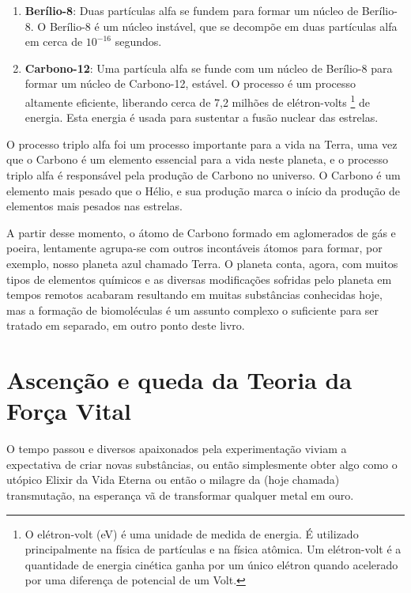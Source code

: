 \documentclass[a4paper,12pt,]{book}
\begin{document}
\begin{enumerate}
	\item \textbf{Berílio-8}: Duas partículas alfa se fundem para formar um núcleo de Berílio-8. O Berílio-8 é um núcleo instável, que se decompõe em duas partículas alfa em cerca de $10^{-16}$ segundos.
	\item \textbf{Carbono-12}: Uma partícula alfa se funde com um núcleo de Berílio-8 para formar um núcleo de Carbono-12, estável. O processo é um processo altamente eficiente, liberando cerca de 7,2 milhões de elétron-volts \footnote{O elétron-volt (eV) é uma unidade de medida de energia. É utilizado principalmente na física de partículas e na física atômica. Um elétron-volt é a quantidade de energia cinética ganha por um único elétron quando acelerado por uma diferença de potencial de um Volt.} de energia. Esta energia é usada para sustentar a fusão nuclear das estrelas.
\end{enumerate}

O processo triplo alfa foi um processo importante para a vida na Terra, uma vez que o Carbono é um elemento essencial para a vida neste planeta, e o processo triplo alfa é responsável pela produção de Carbono no universo. O Carbono é um elemento mais pesado que o Hélio, e sua produção marca o início da produção de elementos mais pesados nas estrelas.

A partir desse momento, o átomo de Carbono formado em aglomerados de gás e poeira, lentamente agrupa-se com outros incontáveis átomos para formar, por exemplo, nosso planeta azul chamado Terra. O planeta conta, agora, com muitos tipos de elementos químicos e as diversas modificações sofridas pelo planeta em tempos remotos acabaram resultando em muitas substâncias conhecidas hoje, mas a formação de biomoléculas é um assunto complexo o suficiente para ser tratado em separado, em outro ponto deste livro.
	
\chapter{Ascenção e queda da Teoria da Força Vital}
\begin{mdframed}[backgroundcolor=orange!20,linewidth=0pt,roundcorner=10pt]
\minitoc
\end{mdframed}
O tempo passou e diversos apaixonados pela experimentação viviam a expectativa de criar novas substâncias, ou então simplesmente obter algo como o utópico Elixir da Vida Eterna ou então o milagre da (hoje chamada) transmutação, na esperança vã de transformar qualquer metal em ouro. 
\end{document}
